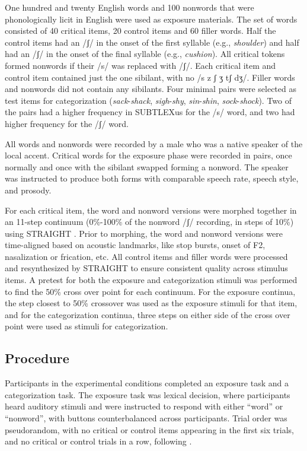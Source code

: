 \documentclass[a4paper,11pt,twocolumn]{article}
\begin{document}
One hundred and twenty English words and 100 nonwords that were phonologically licit in English were used as exposure materials.  The set of words consisted of 40 critical items, 20 control items and 60 filler words.  Half the control items had an /ʃ/ in the onset of the first syllable (e.g., \emph{shoulder}) and half had an /ʃ/ in the onset of the final syllable (e.g., \emph{cushion}).  All critical tokens formed nonwords if their /s/ was replaced with /ʃ/.  Each critical item and control item contained just the one sibilant, with no /s z ʃ ʒ tʃ dʒ/.  Filler words and nonwords did not contain any sibilants. Four minimal pairs were selected as test items for categorization (\emph{sack}-\emph{shack}, \emph{sigh}-\emph{shy}, \emph{sin}-\emph{shin}, \emph{sock}-\emph{shock}).  Two of the pairs had a higher frequency in SUBTLEXus \cite{Brysbaert2009} for the /s/ word, and two had higher frequency for the /ʃ/ word.

All words and nonwords were recorded by a male who was a native speaker of the local accent. Critical words for the exposure phase were recorded in pairs, once normally and once with the sibilant swapped forming a nonword.  The speaker was instructed to produce both forms with comparable speech rate, speech style, and prosody.

For each critical item, the word and nonword versions were morphed together in an 11-step continuum (0\%-100\% of the nonword /ʃ/ recording, in steps of 10\%) using STRAIGHT \cite{Kawahara2008}.  Prior to morphing, the word and nonword versions were time-aligned based on acoustic landmarks, like stop bursts, onset of F2, nasalization or frication, etc.  All control items and filler words were processed and resynthesized by STRAIGHT to ensure consistent quality across stimulus items.  A pretest for both the exposure and categorization stimuli was performed to find the 50\% cross over point for each continuum.  For the exposure continua, the step closest to 50\% crossover was used as the exposure stimuli for that item, and for the categorization continua, three steps on either side of the cross over point were used as stimuli for categorization.

\subsection{Procedure}
Participants in the experimental conditions completed an exposure task and a categorization task.  The exposure task was lexical decision, where participants heard auditory stimuli and were instructed to respond with either ``word'' or ``nonword'', with buttons counterbalanced across participants. Trial order was pseudorandom, with no critical or control items appearing in the first six trials, and no critical or control trials in a row, following \cite{Reinisch2013}.
\end{document}

